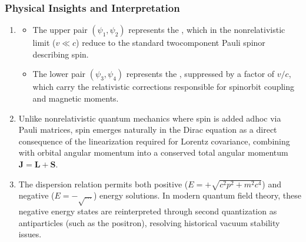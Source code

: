 \documentclass[letterpaper,10pt,english]{jupyterBook}
\begin{document}
\subsubsection*{Physical Insights and Interpretation}
\begin{enumerate}
%
\item {} 
\sphinxAtStartPar
{}
\begin{itemize}
\item {} 
\sphinxAtStartPar
The upper pair \((\psi_1, \psi_2)\) represents the , which in the non\sphinxhyphen{}relativistic limit (\(v \ll c\)) reduce to the standard two\sphinxhyphen{}component Pauli spinor describing spin.

\item {} 
\sphinxAtStartPar
The lower pair \((\psi_3, \psi_4)\) represents the , suppressed by a factor of \(v/c\), which carry the relativistic corrections responsible for spin\sphinxhyphen{}orbit coupling and magnetic moments.

\end{itemize}

\item {} 
\sphinxAtStartPar
{}
Unlike non\sphinxhyphen{}relativistic quantum mechanics where spin is added ad\sphinxhyphen{}hoc via Pauli matrices, spin emerges naturally in the Dirac equation as a direct consequence of the linearization required for Lorentz covariance, combining with orbital angular momentum into a conserved total angular momentum \(\mathbf{J} = \mathbf{L} + \mathbf{S}\).

\item {} 
\sphinxAtStartPar
{}
The dispersion relation permits both positive (\(E = +\sqrt{c^2p^2 + m^2c^4}\)) and negative (\(E = -\sqrt{...}\)) energy solutions. In modern quantum field theory, these negative energy states are reinterpreted through second quantization as antiparticles (such as the positron), resolving historical vacuum stability issues.

\end{enumerate}
\end{document}
